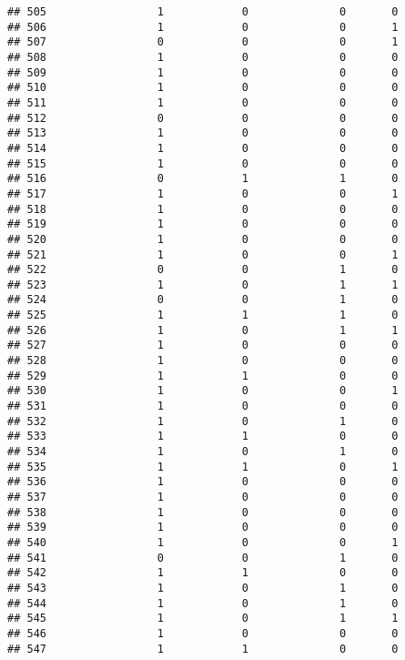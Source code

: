 \documentclass[]{article}
\begin{document}
\begin{verbatim}
## 505                 1            0              0       0
## 506                 1            0              0       1
## 507                 0            0              0       1
## 508                 1            0              0       0
## 509                 1            0              0       0
## 510                 1            0              0       0
## 511                 1            0              0       0
## 512                 0            0              0       0
## 513                 1            0              0       0
## 514                 1            0              0       0
## 515                 1            0              0       0
## 516                 0            1              1       0
## 517                 1            0              0       1
## 518                 1            0              0       0
## 519                 1            0              0       0
## 520                 1            0              0       0
## 521                 1            0              0       1
## 522                 0            0              1       0
## 523                 1            0              1       1
## 524                 0            0              1       0
## 525                 1            1              1       0
## 526                 1            0              1       1
## 527                 1            0              0       0
## 528                 1            0              0       0
## 529                 1            1              0       0
## 530                 1            0              0       1
## 531                 1            0              0       0
## 532                 1            0              1       0
## 533                 1            1              0       0
## 534                 1            0              1       0
## 535                 1            1              0       1
## 536                 1            0              0       0
## 537                 1            0              0       0
## 538                 1            0              0       0
## 539                 1            0              0       0
## 540                 1            0              0       1
## 541                 0            0              1       0
## 542                 1            1              0       0
## 543                 1            0              1       0
## 544                 1            0              1       0
## 545                 1            0              1       1
## 546                 1            0              0       0
## 547                 1            1              0       0

\end{verbatim}
\end{document}
